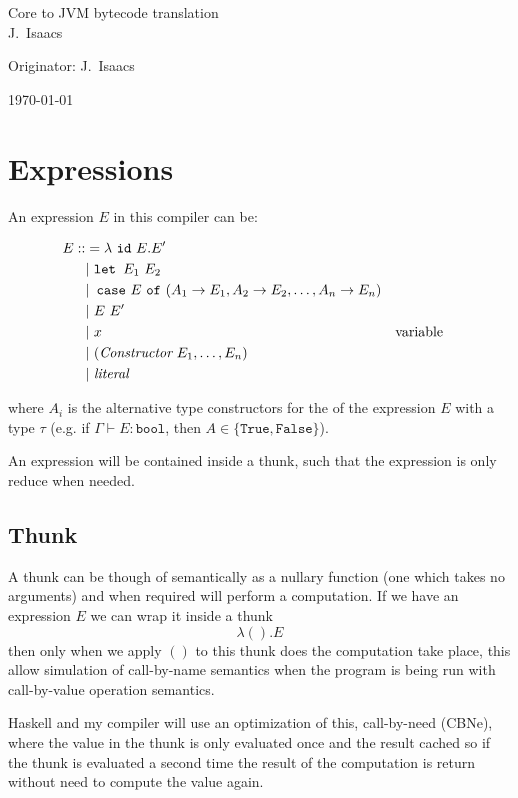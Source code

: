 \documentclass[12pt,a4paper,twoside]{article}
\begin{document}
\begin{center}
  \Large
  Core to JVM bytecode translation\\[4mm]

  J.~Isaacs

  Originator: J.~Isaacs 

  \today
\end{center}

\section{Expressions}

An expression $E$ in this compiler can be:

\begin{align*}
E ::&= \lambda\ \texttt{id}\ E . E' \\
   &|\ \texttt{let } E_1 \ E_2\\ 
   &| \texttt{ case}\ E \ \texttt{of} \ (A_1 \rightarrow E_1, A_2 \rightarrow E_2, \mathellipsis, A_n \rightarrow E_n)\\
   &|\ E\ E'\\
   &|\ x &&\text{variable}\\
   &|\ (\textit{Constructor}\ E_1, \mathellipsis, E_n )\\
   &|\ \textit{literal}
\end{align*}

where $A_i$ is the alternative type constructors for the of the expression $E$ with a type $\tau$
(e.g. if $\Gamma \vdash E : \texttt{bool}$, then $A \in \{ \texttt{True},  \texttt{False} \}$).


An expression will be contained inside a thunk, such that the expression is only reduce when needed.

\subsection{Thunk}

A thunk can be though of semantically as a nullary function (one which takes no arguments) and when required will 
perform a computation. If we have an expression $E$ we can wrap it inside a thunk \[ \lambda (). E \] then 
only when we apply $()$ to this thunk does the computation take place, this allow simulation of call-by-name semantics
when the program is being run with call-by-value operation semantics. 

Haskell and my compiler will use an optimization of this, call-by-need (CBNe), where the value in the thunk is only evaluated once and the 
result cached so if the thunk is evaluated a second time the result of the computation is return without need to compute the value again.
\end{document}

